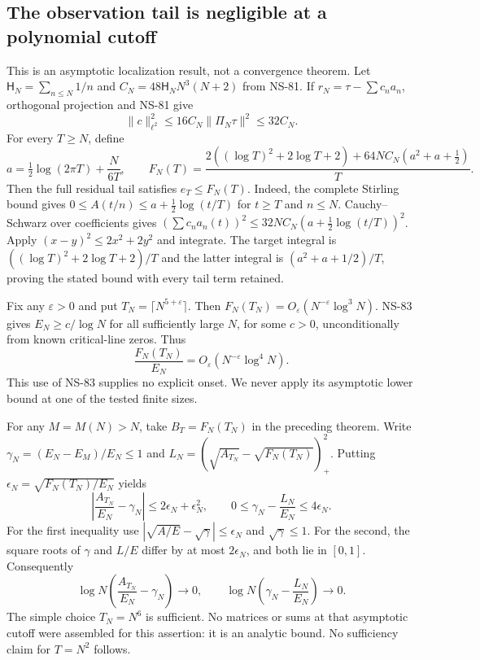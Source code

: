 \subsection{The observation tail is negligible at a polynomial cutoff}
This is an asymptotic localization result, not a convergence theorem.
Let $\mathsf H_N=\sum_{n\le N}1/n$ and
$C_N=48\mathsf H_NN^3(N+2)$ from NS-81. If
$r_N=\tau-\sum c_na_n$, orthogonal projection and NS-81 give
\[
 \|c\|_{\ell^2}^2\le16C_N\|\Pi_N\tau\|^2\le32C_N.
\]
For every $T\ge N$, define
\[
 a=\tfrac12\log(2\pi T)+\frac{N}{6T},\qquad
 F_N(T)=\frac{2((\log T)^2+2\log T+2)
                 +64NC_N(a^2+a+\tfrac12)}{T}.
\]
Then the full residual tail satisfies $e_T\le F_N(T)$.
Indeed, the complete Stirling bound gives
$0\le A(t/n)\le a+\tfrac12\log(t/T)$ for $t\ge T$ and $n\le N$.
Cauchy--Schwarz over coefficients gives
$(\sum c_na_n(t))^2\le32NC_N(a+\tfrac12\log(t/T))^2$.
Apply $(x-y)^2\le2x^2+2y^2$ and integrate. The target integral is
$((\log T)^2+2\log T+2)/T$ and the latter integral is
$(a^2+a+1/2)/T$, proving the stated bound with every tail term retained.

Fix any $\varepsilon>0$ and put $T_N=\lceil N^{5+\varepsilon}\rceil$.
Then $F_N(T_N)=O_\varepsilon(N^{-\varepsilon}\log^3N)$.
NS-83 gives $E_N\ge c/\log N$ for all sufficiently large $N$, for some
$c>0$, unconditionally from known critical-line zeros. Thus
\begin{equation}
 \frac{F_N(T_N)}{E_N}
 =O_\varepsilon(N^{-\varepsilon}\log^4N).
 \label{eq:ns87-relative-tail}
\end{equation}
This use of NS-83 supplies no explicit onset. We never apply its
asymptotic lower bound at one of the tested finite sizes.

For any $M=M(N)>N$, take $B_T=F_N(T_N)$ in the preceding theorem.
Write $\gamma_N=(E_N-E_M)/E_N\le1$ and
$L_N=(\sqrt{A_{T_N}}-\sqrt{F_N(T_N)})_+^2$.
Putting $\epsilon_N=\sqrt{F_N(T_N)/E_N}$ yields
\[
 \left|\frac{A_{T_N}}{E_N}-\gamma_N\right|
 \le2\epsilon_N+\epsilon_N^2,\qquad
 0\le\gamma_N-\frac{L_N}{E_N}\le4\epsilon_N.
\]
For the first inequality use
$|\sqrt{A/E}-\sqrt\gamma|\le\epsilon_N$ and $\sqrt\gamma\le1$.
For the second, the square roots of $\gamma$ and $L/E$ differ by at most
$2\epsilon_N$, and both lie in $[0,1]$.
Consequently
\begin{equation}
 \log N\left(\frac{A_{T_N}}{E_N}-\gamma_N\right)\longrightarrow0,
 \qquad
 \log N\left(\gamma_N-\frac{L_N}{E_N}\right)\longrightarrow0.
 \label{eq:ns87-log-scale-localization}
\end{equation}
The simple choice $T_N=N^6$ is sufficient. No matrices or sums at that
asymptotic cutoff were assembled for this assertion: it is an analytic bound.
No sufficiency claim for $T=N^2$ follows.

